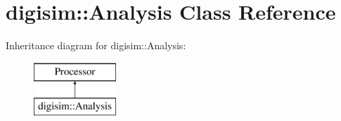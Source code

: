 \section{digisim\-:\-:Analysis Class Reference}
\label{classdigisim_1_1Analysis}
Inheritance diagram for digisim\-:\-:Analysis\-:\begin{figure}[H]
\begin{center}
\leavevmode
\includegraphics[height=2.000000cm]{classdigisim_1_1Analysis}
\end{center}
\end{figure}
